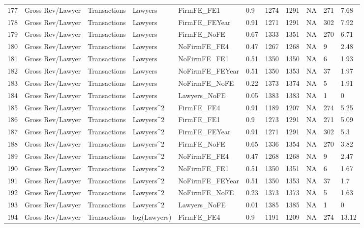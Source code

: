\documentclass{article}
\begin{document}
\begin{table}[H]
\begin{tabular}{rllllllllll}
  177 & Gross Rev/Lawyer & Transactions & Lawyers & FirmFE\_FE1 & 0.9 & 1274 & 1291 & NA & 271 & 7.68 \\
  178 & Gross Rev/Lawyer & Transactions & Lawyers & FirmFE\_FEYear & 0.91 & 1271 & 1291 & NA & 302 & 7.92 \\
  179 & Gross Rev/Lawyer & Transactions & Lawyers & FirmFE\_NoFE & 0.67 & 1333 & 1351 & NA & 270 & 6.71 \\
  180 & Gross Rev/Lawyer & Transactions & Lawyers & NoFirmFE\_FE4 & 0.47 & 1267 & 1268 & NA & 9 & 2.48 \\
  181 & Gross Rev/Lawyer & Transactions & Lawyers & NoFirmFE\_FE1 & 0.51 & 1350 & 1350 & NA & 6 & 1.93 \\
  182 & Gross Rev/Lawyer & Transactions & Lawyers & NoFirmFE\_FEYear & 0.51 & 1350 & 1353 & NA & 37 & 1.97 \\
  183 & Gross Rev/Lawyer & Transactions & Lawyers & NoFirmFE\_NoFE & 0.22 & 1373 & 1374 & NA & 5 & 1.91 \\
  184 & Gross Rev/Lawyer & Transactions & Lawyers & Lawyers\_NoFE & 0.05 & 1383 & 1383 & NA & 1 & 0 \\
  185 & Gross Rev/Lawyer & Transactions & Lawyers^2 & FirmFE\_FE4 & 0.91 & 1189 & 1207 & NA & 274 & 5.25 \\
  186 & Gross Rev/Lawyer & Transactions & Lawyers^2 & FirmFE\_FE1 & 0.9 & 1273 & 1291 & NA & 271 & 5.09 \\
  187 & Gross Rev/Lawyer & Transactions & Lawyers^2 & FirmFE\_FEYear & 0.91 & 1271 & 1291 & NA & 302 & 5.3 \\
  188 & Gross Rev/Lawyer & Transactions & Lawyers^2 & FirmFE\_NoFE & 0.65 & 1336 & 1354 & NA & 270 & 3.82 \\
  189 & Gross Rev/Lawyer & Transactions & Lawyers^2 & NoFirmFE\_FE4 & 0.47 & 1268 & 1268 & NA & 9 & 2.47 \\
  190 & Gross Rev/Lawyer & Transactions & Lawyers^2 & NoFirmFE\_FE1 & 0.51 & 1350 & 1351 & NA & 6 & 1.67 \\
  191 & Gross Rev/Lawyer & Transactions & Lawyers^2 & NoFirmFE\_FEYear & 0.51 & 1350 & 1353 & NA & 37 & 1.7 \\
  192 & Gross Rev/Lawyer & Transactions & Lawyers^2 & NoFirmFE\_NoFE & 0.23 & 1373 & 1373 & NA & 5 & 1.63 \\
  193 & Gross Rev/Lawyer & Transactions & Lawyers^2 & Lawyers\_NoFE & 0.01 & 1385 & 1385 & NA & 1 & 0 \\
  194 & Gross Rev/Lawyer & Transactions & log(Lawyers) & FirmFE\_FE4 & 0.9 & 1191 & 1209 & NA & 274 & 13.12 \\

\end{tabular}
\end{table}
\end{document}
